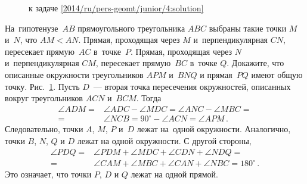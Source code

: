 \ifsolution
\begin{figure}\centering
    \caption{к задаче \ref{2014/ru/pers-geomt/junior/4:solution}}
    \label{2014/ru/pers-geomt/junior/4:solution:fig}
\end{figure}%
\fi %

\problem
На~гипотенузе~$AB$ прямоугольного треугольника $ABC$ выбраны такие точки
$M$ и~$N$, что $AM < AN$.
Прямая, проходящая через $M$ и~перпендикулярная $CN$, пересекает прямую~$AC$
в~точке~$P$.
Прямая, проходящая через $N$ и~перпендикулярная $CM$, пересекает прямую~$BC$
в~точке $Q$.
Докажите, что описанные окружности треугольников $APM$ и~$BNQ$ и прямая~$PQ$
имеют общую точку.
\solution
\label{2014/ru/pers-geomt/junior/4:solution}%
Рис.~\ref{2014/ru/pers-geomt/junior/4:solution:fig}.
Пусть $D$~--- вторая точка пересечения окружностей, описанных вокруг треугольников
$ACN$ и~$BCM$.
Тогда
\begin{align*}
    \angle ADM
={}&
    \angle ADC - \angle MDC
=
    \angle ANC - \angle MBC
=\\={}&
    \angle NCB
=
    90^\circ - \angle ACN
=
    \angle APM
\,.\end{align*}
Следовательно, точки $A$, $M$, $P$ и~$D$ лежат на~одной окружности.
Аналогично, точки $B$, $N$, $Q$ и $D$ лежат на одной окружности.
С другой стороны,
\begin{align*}
    \angle PDQ
={}&
    \angle PDM + \angle MDC +\angle CDN + \angle NDQ
=\\={}&
    \angle CAM + \angle MBC +\angle CAN + \angle NBC
=
    180^\circ
\,.\end{align*}
Это означает, что точки $P$, $D$ и $Q$ лежат на одной прямой.
\endproblem
